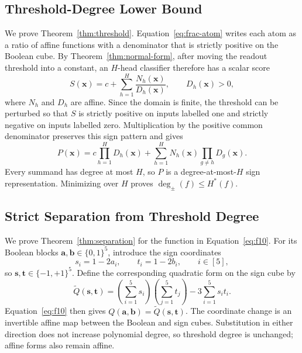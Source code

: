 \documentclass{article}
\theoremstyle{definition}
\theoremstyle{plain}
\newcommand{\hstar}{H^{\ast}}
\newcommand{\tdeg}{\deg_{\pm}}
\newcommand{\bits}{\{0,1\}}
\begin{document}
\subsection{Threshold-Degree Lower Bound}
\label{app:proof-threshold}

We prove Theorem~\ref{thm:threshold}. Equation~\eqref{eq:frac-atom} writes each atom as a ratio of affine functions with a denominator that is strictly positive on the Boolean cube. By Theorem~\ref{thm:normal-form}, after moving the readout threshold into a constant, an $H$-head classifier therefore has a scalar score
\begin{equation}
S(\mathbf{x})=c+\sum_{h=1}^{H}\frac{N_h(\mathbf{x})}{D_h(\mathbf{x})},
\qquad D_h(\mathbf{x})>0,
\label{eq:appendix-rational-score}
\end{equation}
where $N_h$ and $D_h$ are affine. Since the domain is finite, the threshold can be perturbed so that $S$ is strictly positive on inputs labelled one and strictly negative on inputs labelled zero. Multiplication by the positive common denominator preserves this sign pattern and gives
\begin{equation}
P(\mathbf{x})=
c\prod_{h=1}^{H}D_h(\mathbf{x})+
\sum_{h=1}^{H}N_h(\mathbf{x})\prod_{g\neq h}D_g(\mathbf{x}).
\label{eq:appendix-cleared-score}
\end{equation}
Every summand has degree at most $H$, so $P$ is a degree-at-most-$H$ sign representation. Minimizing over $H$ proves $\tdeg(f)\leq\hstar(f)$.

\subsection{Strict Separation from Threshold Degree}
\label{app:proof-separation}

We prove Theorem~\ref{thm:separation} for the function in Equation~\eqref{eq:f10}. For its Boolean blocks $\mathbf{a},\mathbf{b}\in\bits^5$, introduce the sign coordinates
\begin{equation}
s_i=1-2a_i,
\qquad
t_i=1-2b_i,
\qquad i\in[5],
\label{eq:f10-sign-coordinates}
\end{equation}
so $\mathbf{s},\mathbf{t}\in\{-1,+1\}^5$. Define the corresponding quadratic form on the sign cube by
\begin{equation}
\widetilde Q(\mathbf{s},\mathbf{t})=
\left(\sum_{i=1}^{5}s_i\right)\left(\sum_{j=1}^{5}t_j\right)
-3\sum_{i=1}^{5}s_it_i.
\label{eq:f10-signed-form}
\end{equation}
Equation~\eqref{eq:f10} then gives $Q(\mathbf{a},\mathbf{b})=\widetilde Q(\mathbf{s},\mathbf{t})$. The coordinate change is an invertible affine map between the Boolean and sign cubes. Substitution in either direction does not increase polynomial degree, so threshold degree is unchanged; affine forms also remain affine.
\end{document}
